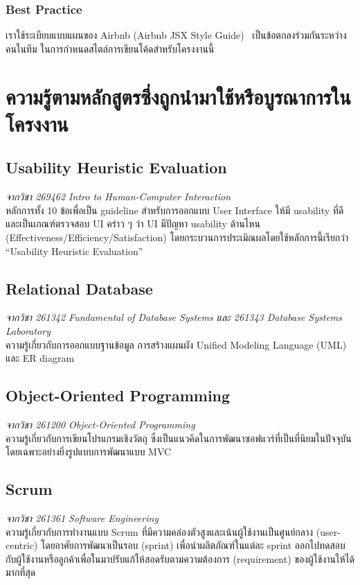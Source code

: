 \subsubsection{Best Practice}
เราใช้ระเบียบแบบแผนของ Airbnb (Airbnb JSX Style Guide)~\cite{airbnb_jsx} เป็นข้อตกลงร่วมกันระหว่างคนในทีม ในการกำหนดสไตล์การเขียนโค้ดสำหรับโครงงานนี้

\section{ความรู้ตามหลักสูตรซึ่งถูกนำมาใช้หรือบูรณาการในโครงงาน}
\subsection{Usability Heuristic Evaluation}
\textit{จากวิชา 269462 Intro to Human-Computer Interaction} \\
หลักการทั้ง 10 ข้อเพื่อเป็น guideline สำหรับการออกแบบ User Interface ให้มี usability ที่ดีและเป็นเกณฑ์ตรวจสอบ UI คร่าว ๆ ว่า UI มีปัญหา usability ด้านไหน (Effectiveness/Efficiency/Satisfaction) โดยกระบวนการประเมิณผลโดยใช้หลักการนี้เรียกว่า ``Usability Heuristic Evaluation''

\subsection{Relational Database}
\textit{จากวิชา 261342 Fundamental of Database Systems และ 261343 Database Systems Laboratory} \\
ความรู้เกี่ยวกับการออกแบบฐานข้อมูล การสร้างแผนผัง Unified Modeling Language (UML) และ ER diagram

\subsection{Object-Oriented Programming}
\textit{จากวิชา 261200 Object-Oriented Programming} \\
ความรู้เกี่ยวกับการเขียนโปรแกรมเชิงวัตถุ ซึ่งเป็นแนวคิดในการพัฒนาซอฟแวร์ที่เป็นที่นิยมในปัจจุบัน โดยเฉพาะอย่างยิ่งรูปแบบการพัฒนาแบบ MVC

\subsection{Scrum}
\textit{จากวิชา 261361 Software Engineering} \\
ความรู้เกี่ยวกับการทำงานแบบ Scrum ที่มีความคล่องตัวสูงและเน้นผู้ใช้งานเป็นศูนย์กลาง (user-centric) โดยอาศัยการพัฒนาเป็นรอบ (sprint) เพื่อนำผลิตภัณฑ์ในแต่ละ sprint ออกไปทดสอบกับผู้ใช้งานหรือลูกค้าเพื่อในมาปรับแก้ให้สอดรับตามความต้องการ (requirement) ของผู้ใช้งานให้ได้มากที่สุด

